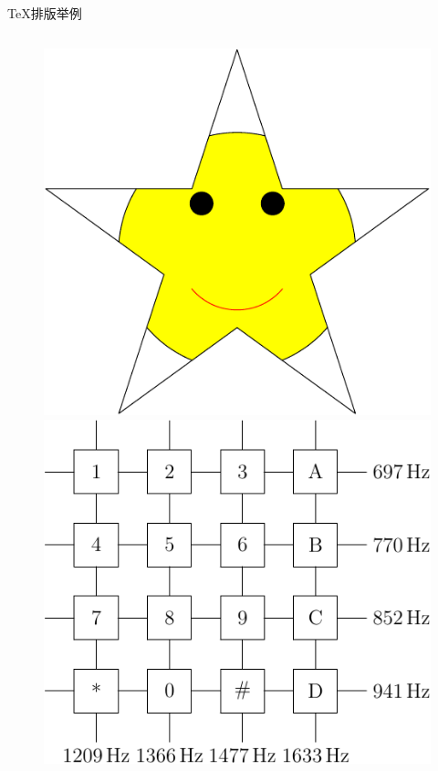 \documentclass[xcolor=table,svgnames]{beamer}
\begin{document}
\begin{frame}{\TeX{}排版举例}
  \begin{columns}
    \begin{column}{.45\textwidth}
      \begin{figure}[h]
        \centering
        \includegraphics[height=.3\textheight]{smiley.pdf}
        \vspace{2ex}
        \includegraphics[height=.4\textheight]{dtmf.pdf}

\end{figure}
\end{column}
\end{columns}
\end{frame}
\end{document}
